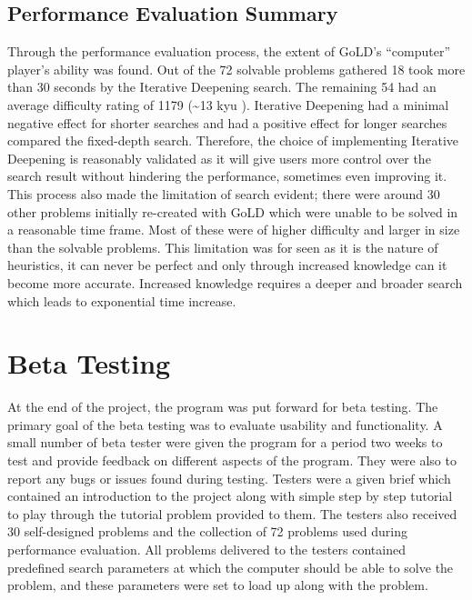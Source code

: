\documentclass{l4proj}
\begin{document}
\subsection{Performance Evaluation Summary}

Through the performance evaluation process, the extent of GoLD’s “computer” player’s ability was found. Out of the 72 solvable problems gathered 18 took more than 30 seconds by the Iterative Deepening search. The remaining 54 had an average difficulty rating of 1179 (\textasciitilde 13 kyu ). Iterative Deepening had a minimal negative effect for shorter searches and had a positive effect for longer searches compared the fixed-depth search. Therefore, the choice of implementing Iterative Deepening is reasonably validated as it will give users more control over the search result without hindering the performance, sometimes even improving it. This process also made the limitation of search evident; there were around 30 other problems initially re-created with GoLD which were unable to be solved in a reasonable time frame. Most of these were of higher difficulty and larger in size than the solvable problems. This limitation was for seen as it is the nature of heuristics, it can never be perfect and only through increased knowledge can it become more accurate. Increased knowledge requires a deeper and broader search which leads to exponential time increase.



\section{Beta Testing}
At the end of the project, the program was put forward for beta testing. The primary goal of the beta testing was to evaluate usability and functionality. A small number of beta tester were given the program for a period two weeks to test and provide feedback on different aspects of the program. They were also to report any bugs or issues found during testing. Testers were a given brief which contained an introduction to the project along with simple step by step tutorial to play through the tutorial problem provided to them. The testers also received 30 self-designed problems and the collection of 72 problems used during performance evaluation. All problems delivered to the testers contained predefined search parameters at which the computer should be able to solve the problem, and these parameters were set to load up along with the problem.
\end{document}
